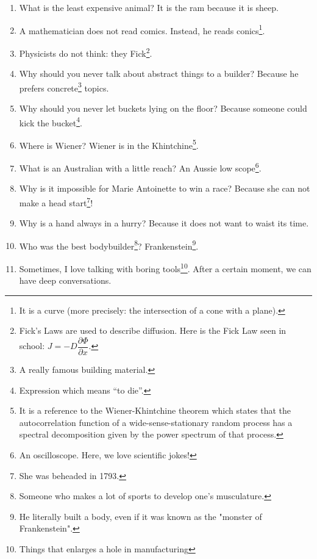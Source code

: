 \documentclass[10pt,a5paper,fullpage]{book}
\begin{document}
\begin{enumerate}
		\item What is the least expensive animal? It is the ram because it is sheep.
		
		\item A mathematician does not read comics. Instead, he reads conics\footnote{It is a curve (more precisely: the intersection of a cone with a plane).}.
		
		\item Physicists do not think: they Fick\footnote{Fick’s Laws are used to describe diffusion. Here is the Fick Law seen in school: $J = -D\dfrac{\partial \Phi}{\partial x}$.}.
		
		\item Why should you never talk about abstract things to a builder? Because he prefers concrete\footnote{A really famous building material.} topics.
		
		\item Why should you never let buckets lying on the floor? Because someone could kick the bucket\footnote{Expression which means “to die”.}.
		
		\item Where is Wiener? Wiener is in the Khintchine\footnote{It is a reference to the Wiener-Khintchine theorem which states that the autocorrelation function of a wide-sense-stationary random process has a spectral decomposition given by the power spectrum of that process.}.
		
		\item What is an Australian with a little reach? An Aussie low scope\footnote{An oscilloscope. Here, we love scientific jokes!}.
		
		\item Why is it impossible for Marie Antoinette to win a race? Because she can not make a head start\footnote{She was beheaded in 1793.}!
		
		\item Why is a hand always in a hurry? Because it does not want to waist its time. 
		
		\item Who was the best bodybuilder\footnote{Someone who makes a lot of sports to develop one's musculature.}? Frankenstein\footnote{He literally built a body, even if it was known as the "monster of Frankenstein".}. 
		
		\item Sometimes, I love talking with boring tools\footnote{Things that enlarges a hole in manufacturing}. After a certain moment, we can have deep conversations. 
	\end{enumerate}
	
\end{document}
